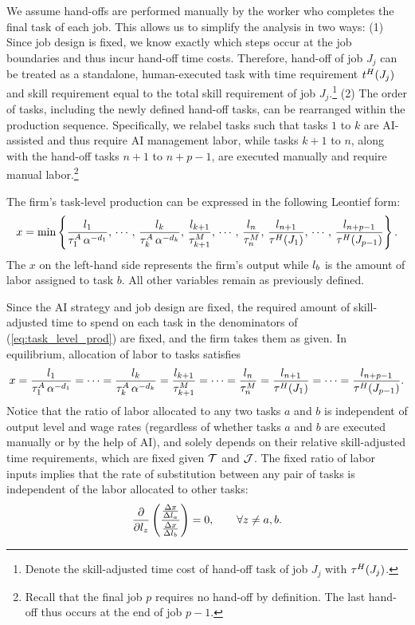 We assume hand-offs are performed manually by the worker who completes the final task of each job.
This allows us to simplify the analysis in two ways:
(1) Since job design is fixed, we know exactly which steps occur at the job boundaries and thus incur hand-off time costs. Therefore, hand-off of job $J_j$ can be treated as a standalone, human-executed task with time requirement \( t^{H}_{}(J_j) \) and skill requirement equal to the total skill requirement of job $J_j$.\footnote{
Denote the skill-adjusted time cost of hand-off task of job $J_j$ with $\tau^{H}_{}(J_j)$.
}
(2) The order of tasks, including the newly defined hand-off tasks, can be rearranged within the production sequence.
Specifically, we relabel tasks such that tasks \( 1 \) to \( k \) are AI-assisted and thus require AI management labor, while tasks \( k+1 \) to \( n \), along with the hand-off tasks \( n+1 \) to \( n+p-1 \), are executed manually and require manual labor.\footnote{
Recall that the final job \( p \) requires no hand-off by definition. The last hand-off thus occurs at the end of job \( p-1 \).
}

The firm's task-level production can be expressed in the following Leontief form:
\begin{equation}
x = \min\left\{\frac{l_{1}}{\tau^{A}_{1}\,\alpha^{-d_{1}}},\,\cdots,\,\frac{l_{k}}{\tau^{A}_{k}\,\alpha^{-d_{k}}},\,\frac{l_{k+1}}{\tau^{M}_{k+1}},\,\cdots,\,\frac{l_{n}}{\tau^{M}_{n}},\,\frac{l_{n+1}}{\tau^{H}_{}(J_1)},\,\cdots,\,\frac{l_{n+p-1}}{\tau^{H}_{}(J_{p-1})}\right\}.\label{eq:task_level_prod}
\end{equation}
The \( x \) on the left-hand side represents the firm's output while $l_{b}$ is the amount of labor assigned to task $b$. All other variables remain as previously defined.

Since the AI strategy and job design are fixed, the required amount of skill-adjusted time to spend on each task in the denominators of (\ref{eq:task_level_prod}) are fixed, and the firm takes them as given.
In equilibrium, allocation of labor to tasks satisfies
\[
x=\frac{l_{1}}{\tau^{A}_{1}\,\alpha^{-d_{1}}}=\cdots=\frac{l_{k}}{\tau^{A}_{k}\,\alpha^{-d_{k}}}=\frac{l_{k+1}}{\tau^{M}_{k+1}}=\cdots=\frac{l_{n}}{\tau^{M}_{n}}=\frac{l_{n+1}}{\tau^{H}_{}(J_1)}=\cdots=\frac{l_{n+p-1}}{\tau^{H}_{}(J_{p-1})}.
\]
Notice that the ratio of labor allocated to any two tasks $a$ and $b$ is independent of output level and wage rates (regardless of whether tasks $a$ and $b$ are executed manually or by the help of AI), and solely depends on their relative skill-adjusted time requirements, which are fixed given $\mathcal{T}$ and $\mathcal{J}$.
The fixed ratio of labor inputs implies that the rate of substitution between any pair of tasks is independent of the labor allocated to other tasks:
\begin{equation}
\frac{\partial}{\partial l_{z}}\left(\frac{\frac{\Delta x}{\Delta l_{a}}}{\frac{\Delta x}{\Delta l_{b}}}\right)=0,\qquad\forall z\neq a,b.\label{eq:task_subst_rate_indep}
\end{equation}

